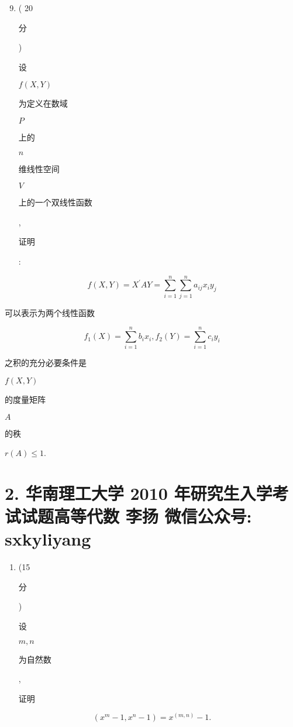 \documentclass[10pt]{article}
\begin{document}
\begin{enumerate}
  \setcounter{enumi}{8}
  \item ( 20 \begin{CJK}{UTF8}{mj}分\end{CJK}) \begin{CJK}{UTF8}{mj}设\end{CJK} $f(X, Y)$ \begin{CJK}{UTF8}{mj}为定义在数域\end{CJK} $P$ \begin{CJK}{UTF8}{mj}上的\end{CJK} $n$ \begin{CJK}{UTF8}{mj}维线性空间\end{CJK} $V$ \begin{CJK}{UTF8}{mj}上的一个双线性函数\end{CJK}, \begin{CJK}{UTF8}{mj}证明\end{CJK}:
\end{enumerate}
$$
f(X, Y)=X^{\prime} A Y=\sum_{i=1}^{n} \sum_{j=1}^{n} a_{i j} x_{i} y_{j}
$$
\begin{CJK}{UTF8}{mj}可以表示为两个线性函数\end{CJK}
$$
f_{1}(X)=\sum_{i=1}^{n} b_{i} x_{i}, f_{2}(Y)=\sum_{i=1}^{n} c_{i} y_{i}
$$
\begin{CJK}{UTF8}{mj}之积的充分必要条件是\end{CJK} $f(X, Y)$ \begin{CJK}{UTF8}{mj}的度量矩阵\end{CJK} $A$ \begin{CJK}{UTF8}{mj}的秩\end{CJK} $r(A) \leq 1$.

\section{2. 华南理工大学 2010 年研究生入学考试试题高等代数 
 李扬 
 微信公众号: sxkyliyang}
\begin{enumerate}
  \item (15 \begin{CJK}{UTF8}{mj}分\end{CJK}) \begin{CJK}{UTF8}{mj}设\end{CJK} $m, n$ \begin{CJK}{UTF8}{mj}为自然数\end{CJK}, \begin{CJK}{UTF8}{mj}证明\end{CJK}
\end{enumerate}
$$
\left(x^{m}-1, x^{n}-1\right)=x^{(m, n)}-1 .
$$
\end{document}
